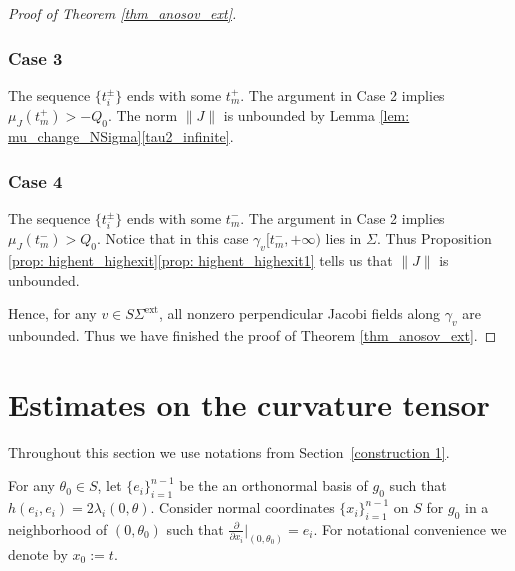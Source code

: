 \documentclass[JEP,XML,SOM,Unicode,NoFloatCountersInSection]{cedram}
\newcommand{\ext}{\mathrm{ext}}
\theoremstyle{definition}
\renewcommand{\>}{{\rangle}}
\newcommand{\<}{{\langle}}
\begin{document}
\begin{proof}[Proof of Theorem \ref{thm_anosov_ext}]
\subsubsection*{Case 3} The sequence $\{t_i^{\pm}\}$ ends with some $t^+_m$. The argument in Case 2 implies $\mu_J(t^+_m)>-Q_0$. The norm $\|J\|$ is unbounded by Lemma \ref{lem: mu_change_NSigma}\eqref{tau2_infinite}.

\subsubsection*{Case 4} The sequence $\{t_i^{\pm}\}$ ends with some $t^-_m$. The argument in Case 2 implies $\mu_J(t^-_m)>Q_0$. Notice that in this case $\gamma_v[t^-_m,+\infty)$ lies in $\Sigma$. Thus Proposition \ref{prop: highent_highexit}\eqref{prop: highent_highexit1} tells us that $\|J\|$ is unbounded.

Hence, for any $v\in S\Sigma^{\ext}$, all nonzero perpendicular Jacobi fields along $\gamma_v$ are unbounded. Thus we have finished the proof of Theorem \ref{thm_anosov_ext}.
\end{proof}

\appendix
\section{Estimates on the curvature tensor}

Throughout this section we use notations from Section~\ref{construction 1}.


For any $\theta_0\in S$, let $\{e_i\}_{i=1}^{n-1}$ be the an orthonormal basis of $g_0$ such that $h(e_i,e_i)=2\lambda_{i}(0,\theta)$. Consider normal coordinates $\{x_i\}_{i=1}^{n-1}$ on $S$ for $g_0$ in a neighborhood of $(0,\theta_0)$ such that $\frac{\partial}{\partial x_i}|_{(0,\theta_0)}=e_i$. For notational convenience we denote by $x_0:=t$.
\end{document}
